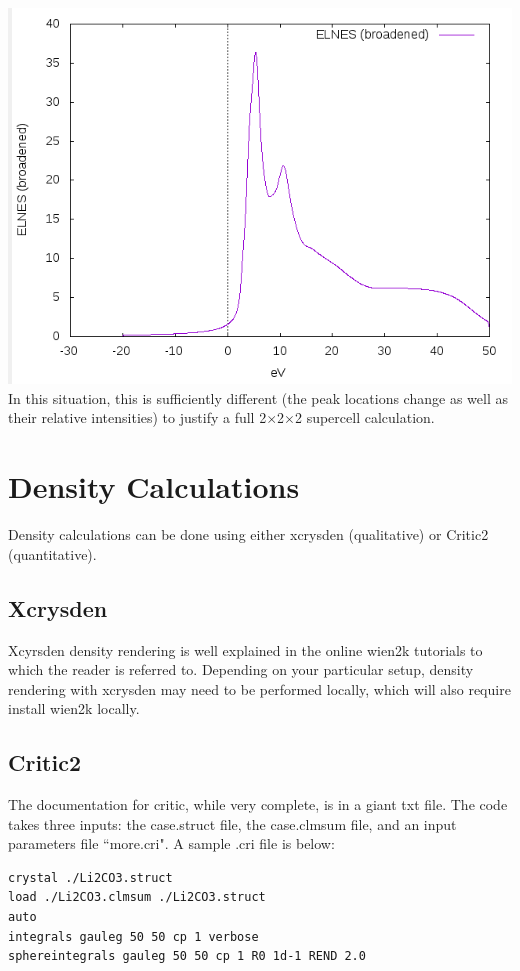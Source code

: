 \documentclass[12pt]{article}
\begin{document}
\includegraphics[scale=0.4]{./images/211_cell_hole_elnes.png}\\

In this situation, this is sufficiently different (the peak locations change as well as their relative intensities) to justify a full 2$\times$2$\times$2 supercell calculation.  

\section{Density Calculations}
Density calculations can be done using either xcrysden (qualitative) or Critic2 (quantitative).


\subsection{Xcrysden}
Xcyrsden density rendering is well explained in the online wien2k tutorials to which the reader is referred to.  Depending on your particular setup, density rendering with xcrysden may need to be performed locally, which will also require install wien2k locally. 

\subsection{Critic2}
The documentation for critic, while very complete, is in a giant txt file. The code takes three inputs: the case.struct file, the case.clmsum file, and an input parameters file ``more.cri".  A sample .cri file is below: 

\begin{lstlisting}
crystal ./Li2CO3.struct
load ./Li2CO3.clmsum ./Li2CO3.struct
auto
integrals gauleg 50 50 cp 1 verbose
sphereintegrals gauleg 50 50 cp 1 R0 1d-1 REND 2.0
\end{lstlisting}
\end{document}
